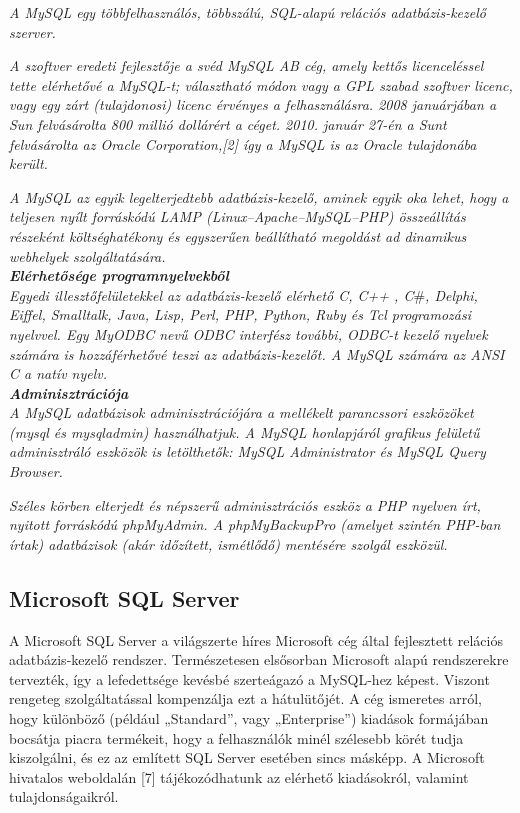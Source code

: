 \textit{A MySQL egy többfelhasználós, többszálú, SQL-alapú relációs adatbázis-kezelő szerver.}

\textit{A szoftver eredeti fejlesztője a svéd MySQL AB cég, amely kettős licenceléssel tette elérhetővé a MySQL-t; választható módon vagy a GPL szabad szoftver licenc, vagy egy zárt (tulajdonosi) licenc érvényes a felhasználásra. 2008 januárjában a Sun felvásárolta 800 millió dollárért a céget. 2010. január 27-én a Sunt felvásárolta az Oracle Corporation,[2] így a MySQL is az Oracle tulajdonába került.}

\textit{A MySQL az egyik legelterjedtebb adatbázis-kezelő, aminek egyik oka lehet, hogy a teljesen nyílt forráskódú LAMP (Linux–Apache–MySQL–PHP) összeállítás részeként költséghatékony és egyszerűen beállítható megoldást ad dinamikus webhelyek szolgáltatására.}\\

\noindent\textit{\textbf{Elérhetősége programnyelvekből}}\\

\textit{Egyedi illesztőfelületekkel az adatbázis-kezelő elérhető C, C++ , C}\#\textit{, Delphi, Eiffel, Smalltalk, Java, Lisp, Perl, PHP, Python, Ruby és Tcl programozási nyelvvel. Egy MyODBC nevű ODBC interfész további, ODBC-t kezelő nyelvek számára is hozzáférhetővé teszi az adatbázis-kezelőt. A MySQL számára az ANSI C a natív nyelv.}\\

\noindent\textit{\textbf{Adminisztrációja}}\\

\textit{A MySQL adatbázisok adminisztrációjára a mellékelt parancssori eszközöket (mysql és mysqladmin) használhatjuk. A MySQL honlapjáról grafikus felületű adminisztráló eszközök is letölthetők: MySQL Administrator és MySQL Query Browser.}

\textit{Széles körben elterjedt és népszerű adminisztrációs eszköz a PHP nyelven írt, nyitott forráskódú phpMyAdmin. A phpMyBackupPro (amelyet szintén PHP-ban írtak) adatbázisok (akár időzített, ismétlődő) mentésére szolgál eszközül.}



\subsection{Microsoft SQL Server}

A Microsoft SQL Server a világszerte híres Microsoft cég által fejlesztett relációs adatbázis-kezelő rendszer.
Természetesen elsősorban Microsoft alapú rendszerekre tervezték, így a lefedettsége kevésbé szerteágazó a MySQL-hez képest. Viszont rengeteg szolgáltatással kompenzálja ezt a hátulütőjét.
A cég ismeretes arról, hogy különböző (például „Standard”, vagy „Enterprise”) kiadások formájában bocsátja piacra termékeit, hogy a felhasználók minél szélesebb körét tudja kiszolgálni, és ez az említett SQL Server esetében sincs másképp. A Microsoft hivatalos weboldalán [7] tájékozódhatunk az elérhető kiadásokról, valamint tulajdonságaikról.

